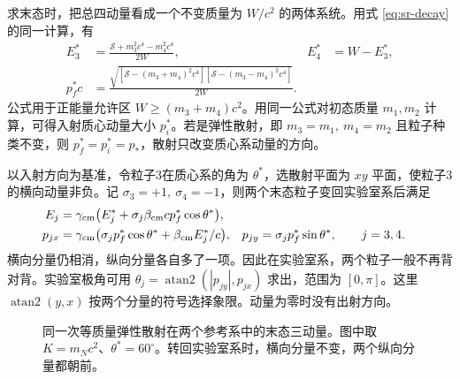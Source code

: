 求末态时，把总四动量看成一个不变质量为 $W/c^2$ 的两体系统。用式 \eqref{eq:sr-decay} 的同一计算，有
\begin{align}
E_3^*&=\frac{\mathcal S+m_3^2c^4-m_4^2c^4}{2W},
& E_4^*&=W-E_3^*,\nonumber\\
p_f^*c&=\frac{\sqrt{[\mathcal S-(m_3+m_4)^2c^4]
                              [\mathcal S-(m_3-m_4)^2c^4]}}{2W}.
\label{eq:sr-scatter-cm}
\end{align}
公式用于正能量允许区 $W\ge(m_3+m_4)c^2$。用同一公式对初态质量 $m_1,m_2$ 计算，可得入射质心动量大小 $p_i^*$。若是弹性散射，即 $m_3=m_1,\ m_4=m_2$ 且粒子种类不变，则 $p_f^*=p_i^*=p_*$，散射只改变质心系动量的方向。

以入射方向为基准，令粒子3在质心系的角为 $\theta^*$，选散射平面为 $xy$ 平面，使粒子3的横向动量非负。记 $\sigma_3=+1,\ \sigma_4=-1$，则两个末态粒子变回实验室系后满足
\begin{align}
 E_j&=\gamma_{\rm cm}\bigl(E_j^*
        +\sigma_j\beta_{\rm cm}cp_f^*\cos\theta^*\bigr),\nonumber\\
 p_{jx}&=\gamma_{\rm cm}\bigl(\sigma_jp_f^*\cos\theta^*
                          +\beta_{\rm cm}E_j^*/c\bigr),&
 p_{jy}&=\sigma_jp_f^*\sin\theta^*,\qquad j=3,4.
\label{eq:sr-scatter-boost}
\end{align}
横向分量仍相消，纵向分量各自多了一项。因此在实验室系，两个粒子一般不再背对背。实验室极角可用 $\theta_j=\operatorname{atan2}(|p_{jy}|,p_{jx})$ 求出，范围为 $[0,\pi]$。这里 $\operatorname{atan2}(y,x)$ 按两个分量的符号选择象限。动量为零时没有出射方向。

\begin{figure}[htbp]
\centering
{}
\caption{同一次等质量弹性散射在两个参考系中的末态三动量。图中取 $K=m_Nc^2$、$\theta^*=60^\circ$。转回实验室系时，横向分量不变，两个纵向分量都朝前。}
\label{fig:sr-two-to-two}
\end{figure}

